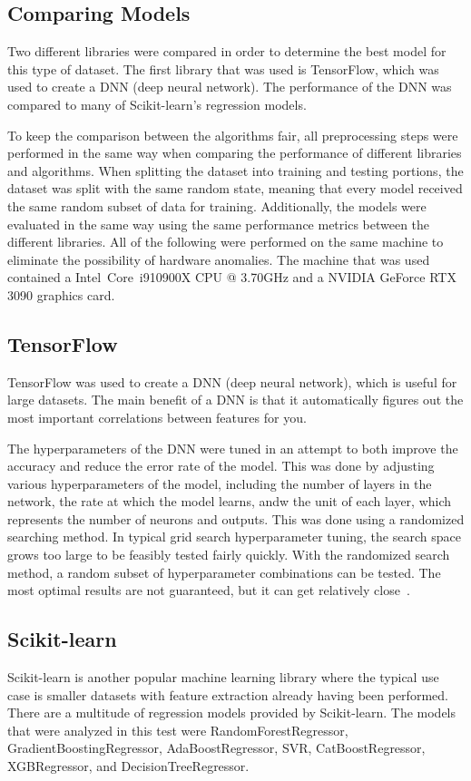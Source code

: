 \documentclass[lettersize,journal]{IEEEtran}
\begin{document}
\subsection{Comparing Models}
Two different libraries were compared in order to determine the best model for this type of dataset. The first library that was used is TensorFlow, which was used to create a DNN (deep neural network). The performance of the DNN was compared to many of Scikit-learn's regression models.

To keep the comparison between the algorithms fair, all preprocessing steps were performed in the same way when comparing the performance of different libraries and algorithms. When splitting the dataset into training and testing portions, the dataset was split with the same random state, meaning that every model received the same random subset of data for training. Additionally, the models were evaluated in the same way using the same performance metrics between the different libraries. All of the following were performed on the same machine to eliminate the possibility of hardware anomalies. The machine that was used contained a  Intel\textregistered~Core\texttrademark~i9\-10900X CPU @ 3.70GHz and a NVIDIA GeForce RTX 3090 graphics card. 


\subsection{TensorFlow}
TensorFlow was used to create a DNN (deep neural network), which is useful for large datasets. The main benefit of a DNN is that it automatically figures out the most important correlations between features for you. 

The hyperparameters of the DNN were tuned in an attempt to both improve the accuracy and reduce the error rate of the model. This was done by adjusting various hyperparameters of the model, including the number of layers in the network, the rate at which the model learns, andw the unit of each layer, which represents the number of neurons and outputs. This was done using a randomized searching method. In typical grid search hyperparameter tuning, the search space grows too large to be feasibly tested fairly quickly. With the randomized search method, a random subset of hyperparameter combinations can be tested. The most optimal results are not guaranteed, but it can get relatively close~\cite{omalley2019kerastuner}. 


\subsection{Scikit-learn}
Scikit-learn is another popular machine learning library where the typical use case is smaller datasets with feature extraction already having been performed. There are a multitude of regression models provided by Scikit-learn. The models that were analyzed in this test were RandomForestRegressor, GradientBoostingRegressor, AdaBoostRegressor, SVR, CatBoostRegressor, XGBRegressor, and DecisionTreeRegressor.
\end{document}
